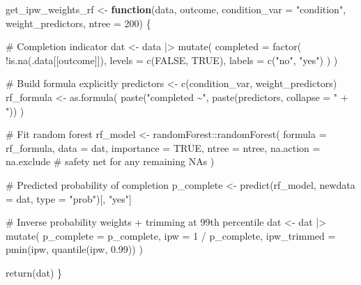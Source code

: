\documentclass[
  letterpaper,
  DIV=11,
  numbers=noendperiod]{scrartcl}
\newenvironment{Shaded}{\begin{snugshade}}{\end{snugshade}}
\newcommand{\AttributeTok}[1]{\textcolor[rgb]{0.40,0.45,0.13}{#1}}
\newcommand{\CommentTok}[1]{\textcolor[rgb]{0.37,0.37,0.37}{#1}}
\newcommand{\ConstantTok}[1]{\textcolor[rgb]{0.56,0.35,0.01}{#1}}
\newcommand{\ControlFlowTok}[1]{\textcolor[rgb]{0.00,0.23,0.31}{\textbf{#1}}}
\newcommand{\DecValTok}[1]{\textcolor[rgb]{0.68,0.00,0.00}{#1}}
\newcommand{\FloatTok}[1]{\textcolor[rgb]{0.68,0.00,0.00}{#1}}
\newcommand{\FunctionTok}[1]{\textcolor[rgb]{0.28,0.35,0.67}{#1}}
\newcommand{\NormalTok}[1]{\textcolor[rgb]{0.00,0.23,0.31}{#1}}
\newcommand{\OtherTok}[1]{\textcolor[rgb]{0.00,0.23,0.31}{#1}}
\newcommand{\SpecialCharTok}[1]{\textcolor[rgb]{0.37,0.37,0.37}{#1}}
\newcommand{\StringTok}[1]{\textcolor[rgb]{0.13,0.47,0.30}{#1}}
\begin{document}
\begin{Shaded}
\begin{Highlighting}[]
\NormalTok{get\_ipw\_weights\_rf }\OtherTok{\textless{}{-}} \ControlFlowTok{function}\NormalTok{(data,}
\NormalTok{                               outcome,}
                               \AttributeTok{condition\_var =} \StringTok{"condition"}\NormalTok{,}
\NormalTok{                               weight\_predictors,}
                               \AttributeTok{ntree =} \DecValTok{200}\NormalTok{) \{}
  
  \CommentTok{\# Completion indicator}
\NormalTok{  dat }\OtherTok{\textless{}{-}}\NormalTok{ data }\SpecialCharTok{|\textgreater{}}
    \FunctionTok{mutate}\NormalTok{(}
      \AttributeTok{completed =} \FunctionTok{factor}\NormalTok{(}
        \SpecialCharTok{!}\FunctionTok{is.na}\NormalTok{(.data[[outcome]]),}
        \AttributeTok{levels =} \FunctionTok{c}\NormalTok{(}\ConstantTok{FALSE}\NormalTok{, }\ConstantTok{TRUE}\NormalTok{),}
        \AttributeTok{labels =} \FunctionTok{c}\NormalTok{(}\StringTok{"no"}\NormalTok{, }\StringTok{"yes"}\NormalTok{)}
\NormalTok{      )}
\NormalTok{    )}
  
  \CommentTok{\# Build formula explicitly}
\NormalTok{  predictors }\OtherTok{\textless{}{-}} \FunctionTok{c}\NormalTok{(condition\_var, weight\_predictors)}
\NormalTok{  rf\_formula }\OtherTok{\textless{}{-}} \FunctionTok{as.formula}\NormalTok{(}
    \FunctionTok{paste}\NormalTok{(}\StringTok{"completed \textasciitilde{}"}\NormalTok{, }\FunctionTok{paste}\NormalTok{(predictors, }\AttributeTok{collapse =} \StringTok{" + "}\NormalTok{))}
\NormalTok{  )}
  
  \CommentTok{\# Fit random forest}
\NormalTok{  rf\_model }\OtherTok{\textless{}{-}}\NormalTok{ randomForest}\SpecialCharTok{::}\FunctionTok{randomForest}\NormalTok{(}
    \AttributeTok{formula  =}\NormalTok{ rf\_formula,}
    \AttributeTok{data     =}\NormalTok{ dat,}
    \AttributeTok{importance =} \ConstantTok{TRUE}\NormalTok{,}
    \AttributeTok{ntree    =}\NormalTok{ ntree,}
    \AttributeTok{na.action =}\NormalTok{ na.exclude   }\CommentTok{\# safety net for any remaining NAs}
\NormalTok{  )}
  
  \CommentTok{\# Predicted probability of completion}
\NormalTok{  p\_complete }\OtherTok{\textless{}{-}} \FunctionTok{predict}\NormalTok{(rf\_model, }\AttributeTok{newdata =}\NormalTok{ dat, }\AttributeTok{type =} \StringTok{"prob"}\NormalTok{)[, }\StringTok{"yes"}\NormalTok{]}
  
  \CommentTok{\# Inverse probability weights + trimming at 99th percentile}
\NormalTok{  dat }\OtherTok{\textless{}{-}}\NormalTok{ dat }\SpecialCharTok{|\textgreater{}}
    \FunctionTok{mutate}\NormalTok{(}
      \AttributeTok{p\_complete  =}\NormalTok{ p\_complete,}
      \AttributeTok{ipw         =} \DecValTok{1} \SpecialCharTok{/}\NormalTok{ p\_complete,}
      \AttributeTok{ipw\_trimmed =} \FunctionTok{pmin}\NormalTok{(ipw, }\FunctionTok{quantile}\NormalTok{(ipw, }\FloatTok{0.99}\NormalTok{))}
\NormalTok{    )}
  
  \FunctionTok{return}\NormalTok{(dat)}
\NormalTok{\}}
\end{Highlighting}
\end{Shaded}
\end{document}
